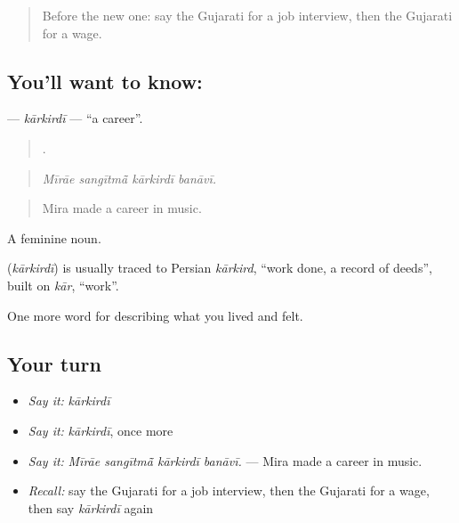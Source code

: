 \label{lesson:GU-C512-karkirdi}



\begin{quote}
Before the new one: say the Gujarati for a job interview, then the Gujarati for a wage.
\end{quote}

\subsection*{You'll want to know: }
\textbf{} — \emph{kārkirdī} — \textquotedblleft{}a career\textquotedblright{}.

\begin{quote}
   .
\end{quote}

\begin{quote}
\emph{Mīrāe sangītmā̃ kārkirdī banāvī.}
\end{quote}

\begin{quote}
Mira made a career in music.
\end{quote}

A feminine noun.

\begin{cousinweb}
\textbf{} (\emph{kārkirdī}) is usually traced to Persian \emph{kārkird}, \textquotedblleft{}work done, a record of deeds\textquotedblright{}, built on \emph{kār}, \textquotedblleft{}work\textquotedblright{}.
\end{cousinweb}

\begin{grammarlens}[title={What you've built}]
One more word for describing what you lived and felt.
\end{grammarlens}

\subsection*{Your turn}
\begin{itemize}
\raggedright
  \item \emph{Say it:} \emph{kārkirdī}
  \item \emph{Say it:} \emph{kārkirdī}, once more
  \item \emph{Say it:} \emph{Mīrāe sangītmā̃ kārkirdī banāvī.} — Mira made a career in music.
  \item \emph{Recall:} say the Gujarati for a job interview, then the Gujarati for a wage, then say \emph{kārkirdī} again
\end{itemize}

